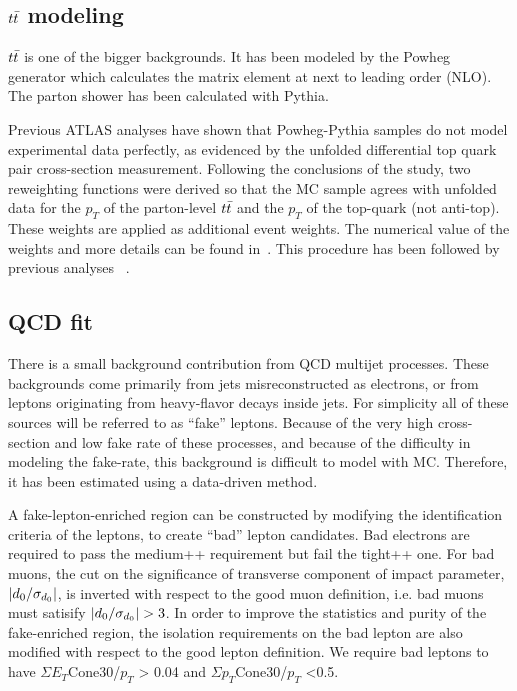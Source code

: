 \subsection{$t\bar{t}$ modeling}
$t\bar{t}$ is one of the bigger  backgrounds. It has been modeled by the Powheg generator which calculates the matrix element 
at next to leading order (NLO). The parton shower has been calculated with Pythia. 

Previous ATLAS analyses have shown that Powheg-Pythia samples do not model experimental data perfectly, as evidenced by the unfolded differential top quark pair cross-section measurement. Following the conclusions of the study, two reweighting functions were derived so that the MC sample agrees with unfolded data for the $p_{T}$ of the parton-level $t\bar{t}$ and the $p_{T}$ of the top-quark (not anti-top). These weights are applied as additional event weights. The numerical value of the weights and more details can be found in~\cite{TWikiReweighting}. This procedure has been followed by previous analyses ~\cite{Aad:2015gra}.


\subsection{QCD fit}
There is a small background contribution from QCD multijet processes.  These backgrounds come primarily from jets misreconstructed as electrons,
or from leptons originating from heavy-flavor decays inside jets. For simplicity all of these sources will be referred to as ``fake'' leptons.
Because of the very high cross-section and low fake rate of these processes, and because of the difficulty in modeling the fake-rate, 
this background is difficult to model with MC. Therefore, it has been estimated using a data-driven method. 

A fake-lepton-enriched region can be constructed by modifying the identification criteria of the leptons, to 
create ``bad'' lepton candidates.  Bad electrons are required to pass the medium++ requirement but fail the tight++ one. 
For bad muons, the cut on the significance of transverse component of impact parameter, $|d_{0}/\sigma_{d_{0}}|$, is inverted with 
respect to the good muon definition, i.e. bad muons must satisify $|\dzsig|>3$. In order to improve the statistics and purity 
of the fake-enriched region, the isolation requirements on the bad lepton  are also modified with respect to the good lepton
definition.   We require bad leptons to have $\Sigma E_{T}$Cone30/$p_{T}$ > 0.04 and $\Sigma p_{T}$Cone30/$p_{T}$ <0.5.
